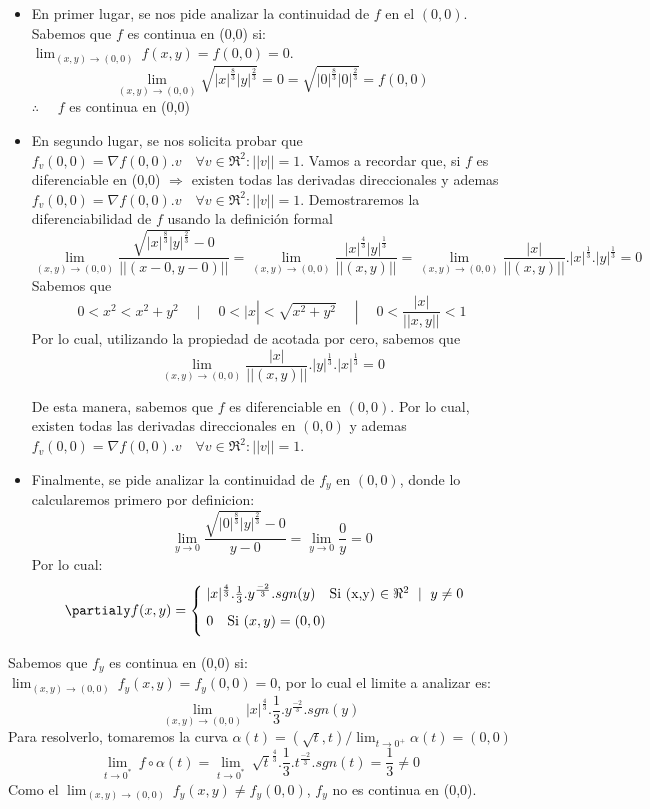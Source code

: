 \begin{solution}
\begin{itemize}
   \item[a)] En primer lugar, se nos pide analizar la continuidad de $f$ en el $(0,0)$. 
Sabemos que $f$ es continua en (0,0) si:  $\lim_{(x,y)\to(0,0)} \ f(x,y) = f(0,0)=0$. 
\[
        \lim_{(x,y)\to (0,0)} \sqrt{|x|^{\frac{8}{3}}|y|^{\frac{2}{3}}}=0=\sqrt{|0|^{\frac{8}{3}}|0|^{\frac{2}{3}}}=f(0,0)
    \]
 $\therefore\quad$ $f$ es continua en (0,0)

     \item[b)] En segundo lugar, se nos solicita probar que $f_v(0,0)=\nabla f(0,0).v \quad \forall v \in \Re^2: ||v||=1.$ 
Vamos a recordar que, si $f$ es diferenciable en (0,0) $\Rightarrow $ existen todas las derivadas direccionales y ademas $f_v(0,0)=\nabla f(0,0).v \quad \forall v \in \Re^2: ||v||=1.$ Demostraremos la diferenciabilidad de $f$ usando la definición formal 
\[
        \lim_{(x,y)\to (0,0)} \frac{\sqrt{|x|^{\frac{8}{3}}|y|^{\frac{2}{3}}}-0}{||(x-0,y-0)||}= \lim_{(x,y)\to (0,0)} \frac{|x|^{\frac{4}{3}}|y|^{\frac{1}{3}}}{||(x,y)||}= \lim_{(x,y)\to (0,0)} \frac{|x|}{||(x,y)||}.|x|^{\frac{1}{3}}.|y|^{\frac{1}{3}}=0
    \]
Sabemos que
\[
        0<x^2<x^2+y^2 \quad\;|\;\quad  0<|x|<\sqrt{x^2+y^2} \quad\;|\;\quad  0<\frac{|x|}{||x,y||}<1
    \]
Por lo cual, utilizando la propiedad de acotada por cero, sabemos que
\[
        \lim_{(x,y)\to (0,0)} \frac{|x|}{||(x,y)||}.|y|^{\frac{1}{3}}.|x|^{\frac{1}{3}}=0
    \]

De esta manera, sabemos que $f$ es diferenciable en $(0,0)$. Por lo cual, existen todas las derivadas direccionales en $(0,0)$ y ademas $f_v(0,0)=\nabla f(0,0).v \quad \forall v \in \Re^2: ||v||=1.$ 
      \item[c)] Finalmente, se pide analizar la continuidad de $f_y $ en $(0,0)$, donde lo calcularemos primero por definicion:
\[
         \lim_{y\to0} \frac{\sqrt{|0|^{\frac{8}{3}}|y|^{\frac{2}{3}}}-0}{y-0}=\lim_{y\to0} \frac{0}{y}=0
    \]
    Por lo cual:
    \[
     \partialy f(x,y)= \begin{cases}
            \;|x|^\frac{4}{3} .\frac{1}{3}.y^\frac{-2}{3}.sgn(y) \quad \text{Si (x,y) $\in \Re^2$ $\;|\;$ $y\neq0$} \\[5pt]
            \;0\quad \text{Si $(x,y)=(0,0)$}\\[5pt] 
        \end{cases}
    \]
\end{itemize}
Sabemos que $f_y$ es continua en (0,0) si:  $\lim_{(x,y)\to(0,0)} \ f_y(x,y) = f_y(0,0)=0$, por lo cual el limite a analizar es: 
\[
        \lim_{(x,y)\to (0,0)} |x|^\frac{4}{3} .\frac{1}{3}.y^\frac{-2}{3}.sgn(y)
    \]
Para resolverlo, tomaremos la curva $\alpha(t)=(\sqrt{t},t) / \lim_{t\to0^+} \alpha(t) = (0,0)$
    \[
         \lim_{t\to0^*} \
          f\circ\alpha(t)=\lim_{t\to0^*} \
         \sqrt{t}^\frac{4}{3} .\frac{1}{3}.t^\frac{-2}{3}.sgn(t)=\frac{1}{3}\neq0
    \]
    Como el $\lim_{(x,y)\to(0,0)} \ f_y(x,y) \neq f_y(0,0)$, $f_y$ no es continua en (0,0).
\end{solution}
